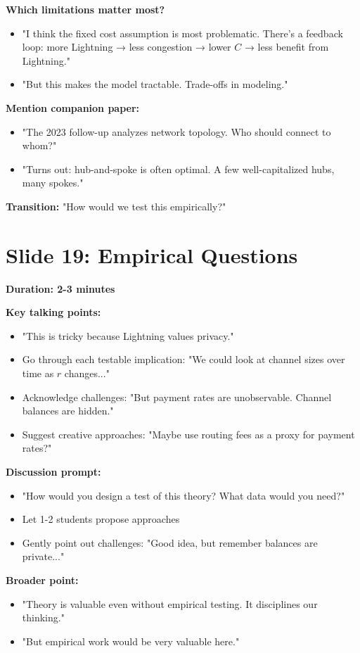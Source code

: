 \documentclass[11pt]{article}
\begin{document}
\textbf{Which limitations matter most?}
\begin{itemize}
    \item "I think the fixed cost assumption is most problematic. There's a feedback loop: more Lightning → less congestion → lower $C$ → less benefit from Lightning."
    \item "But this makes the model tractable. Trade-offs in modeling."
\end{itemize}

\textbf{Mention companion paper:}
\begin{itemize}
    \item "The 2023 follow-up analyzes network topology. Who should connect to whom?"
    \item "Turns out: hub-and-spoke is often optimal. A few well-capitalized hubs, many spokes."
\end{itemize}

\textbf{Transition:} "How would we test this empirically?"

\section*{Slide 19: Empirical Questions}

\textbf{Duration: 2-3 minutes}

\textbf{Key talking points:}
\begin{itemize}
    \item "This is tricky because Lightning values privacy."
    \item Go through each testable implication: "We could look at channel sizes over time as $r$ changes..."
    \item Acknowledge challenges: "But payment rates are unobservable. Channel balances are hidden."
    \item Suggest creative approaches: "Maybe use routing fees as a proxy for payment rates?"
\end{itemize}

\textbf{Discussion prompt:}
\begin{itemize}
    \item "How would you design a test of this theory? What data would you need?"
    \item Let 1-2 students propose approaches
    \item Gently point out challenges: "Good idea, but remember balances are private..."
\end{itemize}

\textbf{Broader point:}
\begin{itemize}
    \item "Theory is valuable even without empirical testing. It disciplines our thinking."
    \item "But empirical work would be very valuable here."
\end{itemize}
\end{document}
